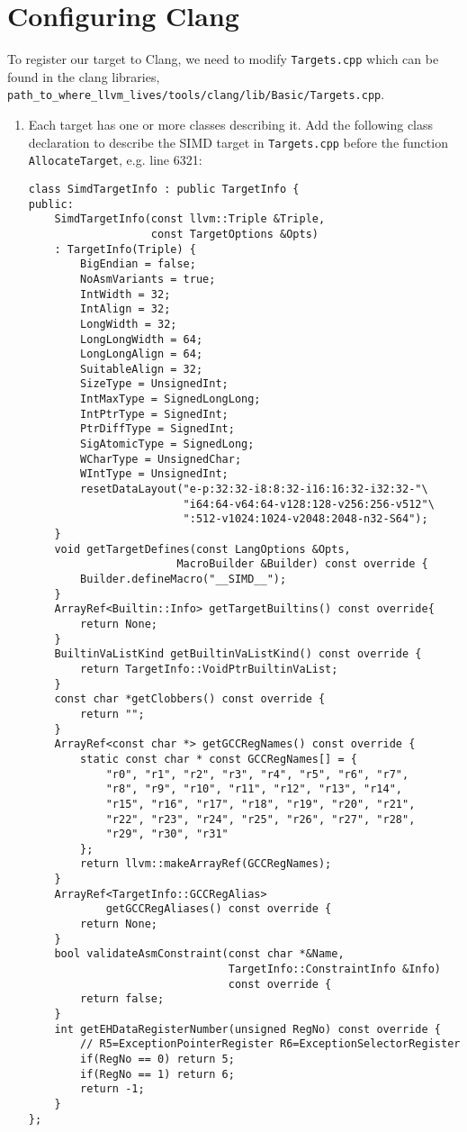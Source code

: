 \section{Configuring Clang}\label{sec:installing_clang}
To register our target to Clang, we need to modify \texttt{Targets.cpp} which can be found in the clang libraries, \texttt{path\_to\_where\_llvm\_lives/tools/clang/lib/Basic/Targets.cpp}.

\lstset{style=customcpp}
\begin{enumerate}
\item Each target has one or more classes describing it. Add the following class declaration to describe the SIMD target in \texttt{Targets.cpp} before the function \texttt{AllocateTarget}, e.g. line 6321:
\begin{lstlisting}
class SimdTargetInfo : public TargetInfo {
public:
    SimdTargetInfo(const llvm::Triple &Triple, 
                   const TargetOptions &Opts)
    : TargetInfo(Triple) {
        BigEndian = false;
        NoAsmVariants = true;
        IntWidth = 32;
        IntAlign = 32;
        LongWidth = 32;
        LongLongWidth = 64;
        LongLongAlign = 64;
        SuitableAlign = 32;
        SizeType = UnsignedInt;
        IntMaxType = SignedLongLong;
        IntPtrType = SignedInt;
        PtrDiffType = SignedInt;
        SigAtomicType = SignedLong;
        WCharType = UnsignedChar;
        WIntType = UnsignedInt;
        resetDataLayout("e-p:32:32-i8:8:32-i16:16:32-i32:32-"\
                        "i64:64-v64:64-v128:128-v256:256-v512"\
                        ":512-v1024:1024-v2048:2048-n32-S64");
    }
    void getTargetDefines(const LangOptions &Opts,
                       MacroBuilder &Builder) const override {
        Builder.defineMacro("__SIMD__");
    }
    ArrayRef<Builtin::Info> getTargetBuiltins() const override{
        return None;
    }
    BuiltinVaListKind getBuiltinVaListKind() const override {
        return TargetInfo::VoidPtrBuiltinVaList;
    }
    const char *getClobbers() const override {
        return "";
    }
    ArrayRef<const char *> getGCCRegNames() const override {
        static const char * const GCCRegNames[] = {
            "r0", "r1", "r2", "r3", "r4", "r5", "r6", "r7", 
            "r8", "r9", "r10", "r11", "r12", "r13", "r14", 
            "r15", "r16", "r17", "r18", "r19", "r20", "r21",
            "r22", "r23", "r24", "r25", "r26", "r27", "r28",
            "r29", "r30", "r31"
        };
        return llvm::makeArrayRef(GCCRegNames);
    }
    ArrayRef<TargetInfo::GCCRegAlias> 
            getGCCRegAliases() const override {
        return None;
    }
    bool validateAsmConstraint(const char *&Name,
                               TargetInfo::ConstraintInfo &Info)
                               const override {
        return false;
    }
    int getEHDataRegisterNumber(unsigned RegNo) const override {
        // R5=ExceptionPointerRegister R6=ExceptionSelectorRegister
        if(RegNo == 0) return 5;
        if(RegNo == 1) return 6;
        return -1;
    }
};
\end{lstlisting}


\end{enumerate}

